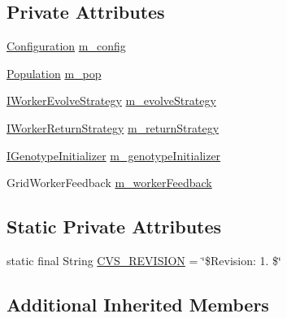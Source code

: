 \subsection*{Private Attributes}
\begin{DoxyCompactItemize}
\item 
\hyperlink{classorg_1_1jgap_1_1_configuration}{Configuration} \hyperlink{classorg_1_1jgap_1_1distr_1_1grid_1_1_j_g_a_p_request_ad7ba848a75c9a1dbe215a44eec8d0067}{m\-\_\-config}
\item 
\hyperlink{classorg_1_1jgap_1_1_population}{Population} \hyperlink{classorg_1_1jgap_1_1distr_1_1grid_1_1_j_g_a_p_request_a77102f568d8057fc264cc2ca9dc7c6ea}{m\-\_\-pop}
\item 
\hyperlink{interfaceorg_1_1jgap_1_1distr_1_1grid_1_1_i_worker_evolve_strategy}{I\-Worker\-Evolve\-Strategy} \hyperlink{classorg_1_1jgap_1_1distr_1_1grid_1_1_j_g_a_p_request_a68195390050789cad789fd7bec62fd65}{m\-\_\-evolve\-Strategy}
\item 
\hyperlink{interfaceorg_1_1jgap_1_1distr_1_1grid_1_1_i_worker_return_strategy}{I\-Worker\-Return\-Strategy} \hyperlink{classorg_1_1jgap_1_1distr_1_1grid_1_1_j_g_a_p_request_a957e295de2a8089f99a23667a5ae8d41}{m\-\_\-return\-Strategy}
\item 
\hyperlink{interfaceorg_1_1jgap_1_1distr_1_1grid_1_1_i_genotype_initializer}{I\-Genotype\-Initializer} \hyperlink{classorg_1_1jgap_1_1distr_1_1grid_1_1_j_g_a_p_request_aad27c31fee71d6853c55459f1875b3e3}{m\-\_\-genotype\-Initializer}
\item 
Grid\-Worker\-Feedback \hyperlink{classorg_1_1jgap_1_1distr_1_1grid_1_1_j_g_a_p_request_ad011d302c184847762d69f35ba3d5c92}{m\-\_\-worker\-Feedback}
\end{DoxyCompactItemize}
\subsection*{Static Private Attributes}
\begin{DoxyCompactItemize}
\item 
static final String \hyperlink{classorg_1_1jgap_1_1distr_1_1grid_1_1_j_g_a_p_request_af41c39d7f0229f6b63d7246db15f4dec}{C\-V\-S\-\_\-\-R\-E\-V\-I\-S\-I\-O\-N} = \char`\"{}\$Revision\-: 1. \$\char`\"{}
\end{DoxyCompactItemize}
\subsection*{Additional Inherited Members}


